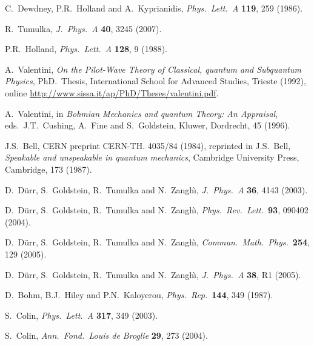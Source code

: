 \documentclass[11pt]{article}
\begin{document}
\begin{thebibliography}{10}
{C.\ Dewdney, P.R.\ Holland and A.\ Kyprianidis, {\em Phys.\ Lett.\ A} {\bf 119}, 259 (1986).}

{R.\ Tumulka, {\em J.\ Phys.\ A} {\bf 40}, 3245 (2007).}

{P.R.\ Holland, {\em Phys.\ Lett.\ A} {\bf 128}, 9 (1988).}

{A.\ Valentini, {\em On the Pilot-Wave Theory of Classical, quantum and
  Subquantum Physics}, PhD.\ Thesis, International School for Advanced Studies,
  Trieste (1992), online  \url{http://www.sissa.it/ap/PhD/Theses/valentini.pdf}.}

{A.\ Valentini, in {\em Bohmian Mechanics and quantum Theory: An Appraisal},
  eds.\ J.T.\ Cushing, A.\ Fine and S.\ Goldstein, Kluwer, Dordrecht, 45
  (1996).}

{J.S.\ Bell, CERN preprint CERN-TH. 4035/84 (1984), reprinted in J.S.\ Bell, {\em Speakable and unspeakable in
  quantum mechanics}, Cambridge University Press, Cambridge, 173 (1987).}

{D.\ D\"urr, S.\ Goldstein, R.\ Tumulka and N.\ Zangh\`\i, {\em J.\ Phys.\ A}
  {\bf 36}, 4143 (2003).}

{D.\ D\"urr, S.\ Goldstein, R.\ Tumulka and N.\ Zangh\`\i, {\em Phys.\ Rev.\
  Lett.}\ {\bf 93}, 090402 (2004).}

{D.\ D\"urr, S.\ Goldstein, R.\ Tumulka and N.\ Zangh\`\i, {\em Commun.\ Math.\
  Phys.}\ {\bf 254}, 129 (2005).}

{D.\ D\"urr, S.\ Goldstein, R.\ Tumulka and N.\ Zangh\`\i, {\em J.\ Phys.\ A}
  {\bf 38}, R1 (2005).}

{D.\ Bohm, B.J.\ Hiley and P.N.\ Kaloyerou, {\em Phys.\ Rep.}\ {\bf 144}, 349
  (1987).}

{S.\ Colin, {\em Phys.\ Lett.\ A} {\bf 317}, 349 (2003).}

{S.\ Colin, {\em Ann.\ Fond.\ Louis de Broglie} {\bf 29}, 273 (2004).}

\end{thebibliography}
\end{document}
